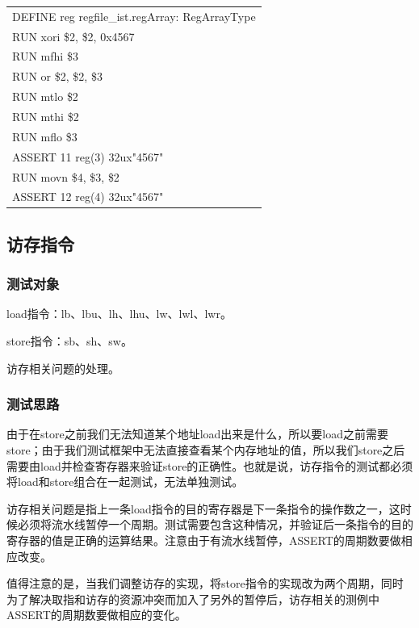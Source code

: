 \documentclass[11pt,utf8]{article}
\begin{document}
{{{{\begin{center}	\begin{longtable}{p{15cm}} \hline
		DEFINE{ }reg{ }regfile\_ist.regArray:{ }RegArrayType\\
		RUN{ }xori{ }\$2,{ }\$2,{ }0x4567\\
		RUN{ }mfhi{ }\$3\\
		RUN{ }or{ }\$2,{ }\$2,{ }\$3\\
		RUN{ }mtlo{ }\$2\\
		RUN{ }mthi{ }\$2\\
		RUN{ }mflo{ }\$3\\
		ASSERT{ }11{ }reg(3){ }32ux"4567"\\
		RUN{ }movn{ }\$4,{ }\$3,{ }\$2\\
		ASSERT{ }12{ }reg(4){ }32ux"4567"\\
		\hline \end{longtable} \end{center}
}
}

\subsection{访存指令} {
\subsubsection{测试对象} {
load指令：lb、lbu、lh、lhu、lw、lwl、lwr。

store指令：sb、sh、sw。

访存相关问题的处理。
}
\subsubsection{测试思路} {
由于在store之前我们无法知道某个地址load出来是什么，所以要load之前需要store；由于我们测试框架中无法直接查看某个内存地址的值，所以我们store之后需要由load并检查寄存器来验证store的正确性。也就是说，访存指令的测试都必须将load和store组合在一起测试，无法单独测试。

访存相关问题是指上一条load指令的目的寄存器是下一条指令的操作数之一，这时候必须将流水线暂停一个周期。测试需要包含这种情况，并验证后一条指令的目的寄存器的值是正确的运算结果。注意由于有流水线暂停，ASSERT的周期数要做相应改变。

值得注意的是，当我们调整访存的实现，将store指令的实现改为两个周期，同时为了解决取指和访存的资源冲突而加入了另外的暂停后，访存相关的测例中ASSERT的周期数要做相应的变化。
}
}}}
\end{document}
